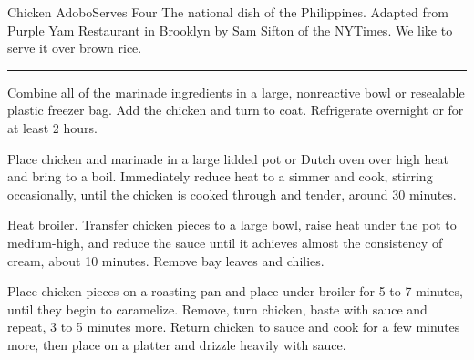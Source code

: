 \begin{recipe}{Chicken Adobo}{Serves Four}{}
\freeform The national dish of the Philippines. Adapted from Purple Yam Restaurant in Brooklyn by Sam Sifton of the NYTimes. We like to serve it over brown rice.\\
\rule{\textwidth}{0.05pt}


Combine all of the marinade ingredients in a large, nonreactive bowl or resealable plastic freezer bag. Add the chicken and turn to coat. Refrigerate overnight or for at least 2 hours.
\newline

Place chicken and marinade in a large lidded pot or Dutch oven over high heat and bring to a boil. Immediately reduce heat to a simmer and cook, stirring occasionally, until the chicken is cooked through and tender, around 30 minutes.
\newline

Heat broiler. Transfer chicken pieces to a large bowl, raise heat under the pot to medium-high, and reduce the sauce until it achieves almost the consistency of cream, about 10 minutes. Remove bay leaves and chilies.
\newline

Place chicken pieces on a roasting pan and place under broiler for 5 to 7 minutes, until they begin to caramelize. Remove, turn chicken, baste with sauce and repeat, 3 to 5 minutes more. Return chicken to sauce and cook for a few minutes more, then place on a platter and drizzle heavily with sauce.
\newline

\end{recipe}